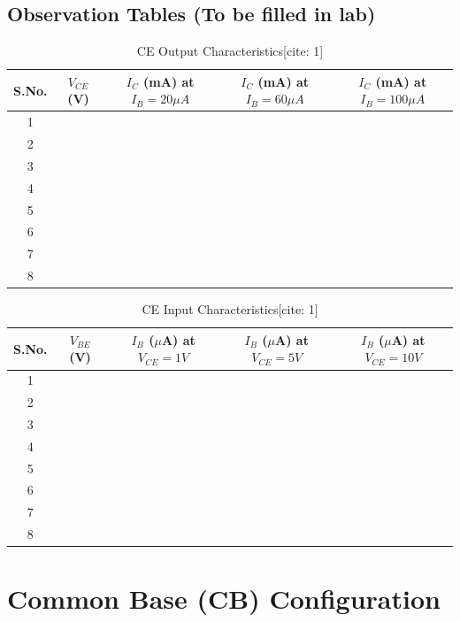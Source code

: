 \documentclass[12pt,a4paper]{article}
\begin{document}
\subsection{Observation Tables (To be filled in lab)}
\begin{table}[H]
    \centering
    \caption{CE Output Characteristics[cite: 1]}
    \begin{tabular}{|c|c|c|c|c|}
        \hline
        \textbf{S.No.} & \textbf{$V_{CE}$ (V)} & \textbf{$I_C$ (mA) at $I_B=20\mu A$} & \textbf{$I_C$ (mA) at $I_B=60\mu A$} & \textbf{$I_C$ (mA) at $I_B=100\mu A$} \\ \hline
        1 & & & & \\ \hline
        2 & & & & \\ \hline
        3 & & & & \\ \hline
        4 & & & & \\ \hline
        5 & & & & \\ \hline
        6 & & & & \\ \hline
        7 & & & & \\ \hline
        8 & & & & \\ \hline
    \end{tabular}
\end{table}

\begin{table}[H]
    \centering
    \caption{CE Input Characteristics[cite: 1]}
    \begin{tabular}{|c|c|c|c|c|}
        \hline
        \textbf{S.No.} & \textbf{$V_{BE}$ (V)} & \textbf{$I_B$ ($\mu$A) at $V_{CE}=1 V$} & \textbf{$I_B$ ($\mu$A) at $V_{CE}=5 V$} & \textbf{$I_B$ ($\mu$A) at $V_{CE}=10 V$} \\ \hline
        1 & & & & \\ \hline
        2 & & & & \\ \hline
        3 & & & & \\ \hline
        4 & & & & \\ \hline
        5 & & & & \\ \hline
        6 & & & & \\ \hline
        7 & & & & \\ \hline
        8 & & & & \\ \hline
    \end{tabular}
\end{table}

\section{Common Base (CB) Configuration}
\end{document}
